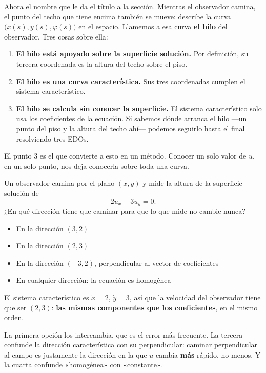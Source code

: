 \documentclass[
  spanish,
  a4paper,
]{scrbook}
\providecommand{\tightlist}{%
  \setlength{\itemsep}{0pt}\setlength{\parskip}{0pt}}
\theoremstyle{definition}
\theoremstyle{plain}
\theoremstyle{definition}
\theoremstyle{plain}
\theoremstyle{definition}
\theoremstyle{remark}
\begin{document}
Ahora el nombre que le da el título a la sección. Mientras el observador
camina, el punto del techo que tiene encima también se mueve: describe
la curva \(\big(x(s), y(s), \varphi(s)\big)\) en el espacio. Llamemos a
esa curva \textbf{el hilo} del observador. Tres cosas sobre ella:

\begin{enumerate}
\def\labelenumi{\arabic{enumi}.}
\tightlist
\item
  \textbf{El hilo está apoyado sobre la superficie solución.} Por
  definición, su tercera coordenada es la altura del techo sobre el
  piso.
\item
  \textbf{El hilo es una curva característica.} Sus tres coordenadas
  cumplen el sistema característico.
\item
  \textbf{El hilo se calcula sin conocer la superficie.} El sistema
  característico solo usa los coeficientes de la ecuación. Si sabemos
  dónde arranca el hilo ---un punto del piso y la altura del techo
  ahí--- podemos seguirlo hasta el final resolviendo tres EDOs.
\end{enumerate}

El punto 3 es el que convierte a esto en un método. Conocer un solo
valor de \(u\), en un solo punto, nos deja conocerla sobre toda una
curva.

Un observador camina por el plano \((x,y)\) y mide la altura de la
superficie solución de \[2u_x + 3u_y = 0.\] ¿En qué dirección tiene que
caminar para que lo que mide no cambie nunca?

\begin{itemize}
\tightlist
\item
  {En la dirección \((3, 2)\)}
\item
  {En la dirección \((2, 3)\)}
\item
  {En la dirección \((-3, 2)\), perpendicular al vector de coeficientes}
\item
  {En cualquier dirección: la ecuación es homogénea}
\end{itemize}

El sistema característico es \(\dot x = 2\), \(\dot y = 3\), así que la
velocidad del observador tiene que ser \((2,3)\): \textbf{las mismas
componentes que los coeficientes}, en el mismo orden.

La primera opción los intercambia, que es el error más frecuente. La
tercera confunde la dirección característica con su perpendicular:
caminar perpendicular al campo es justamente la dirección en la que
\(u\) cambia \textbf{más} rápido, no menos. Y la cuarta confunde
«homogénea» con «constante».
\end{document}
